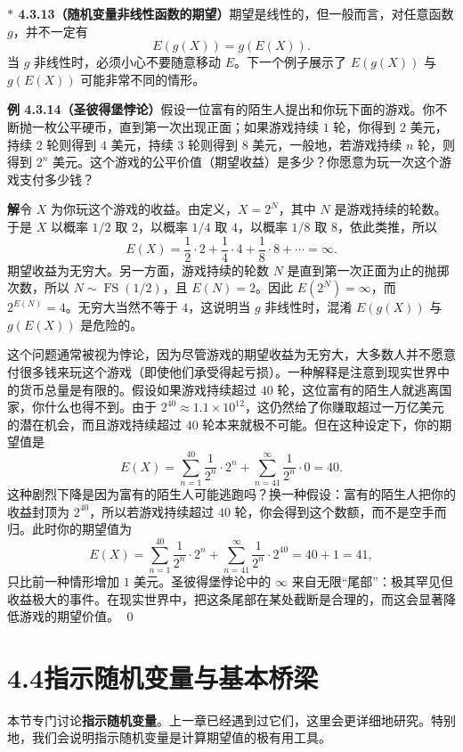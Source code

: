 \documentclass[UTF8, 12pt, fontset=fandol, oneside]{ctexart}
\newcommand{\biohazard}{\ensuremath{\ast}}
\begin{document}
\noindent\textbf{$\biohazard$ 4.3.13（随机变量非线性函数的期望）}\quad 期望是线性的，但一般而言，对任意函数 $g$，并不一定有
\[
  E(g(X))=g(E(X)).
\]
当 $g$ 非线性时，必须小心不要随意移动 $E$。下一个例子展示了 $E(g(X))$ 与 $g(E(X))$ 可能非常不同的情形。

\noindent\textbf{例 4.3.14（圣彼得堡悖论）}\quad 假设一位富有的陌生人提出和你玩下面的游戏。你不断抛一枚公平硬币，直到第一次出现正面；如果游戏持续 $1$ 轮，你得到 $2$ 美元，持续 $2$ 轮则得到 $4$ 美元，持续 $3$ 轮则得到 $8$ 美元，一般地，若游戏持续 $n$ 轮，则得到 $2^n$ 美元。这个游戏的公平价值（期望收益）是多少？你愿意为玩一次这个游戏支付多少钱？

\noindent\textbf{解}\quad 令 $X$ 为你玩这个游戏的收益。由定义，$X=2^N$，其中 $N$ 是游戏持续的轮数。于是 $X$ 以概率 $1/2$ 取 $2$，以概率 $1/4$ 取 $4$，以概率 $1/8$ 取 $8$，依此类推，所以
\[
  E(X)=\frac{1}{2}\cdot 2+\frac{1}{4}\cdot 4+\frac{1}{8}\cdot 8+\cdots=\infty.
\]
期望收益为无穷大。另一方面，游戏持续的轮数 $N$ 是直到第一次正面为止的抛掷次数，所以 $N\sim\operatorname{FS}(1/2)$，且 $E(N)=2$。因此 $E(2^N)=\infty$，而 $2^{E(N)}=4$。无穷大当然不等于 $4$，这说明当 $g$ 非线性时，混淆 $E(g(X))$ 与 $g(E(X))$ 是危险的。

这个问题通常被视为悖论，因为尽管游戏的期望收益为无穷大，大多数人并不愿意付很多钱来玩这个游戏（即使他们承受得起亏损）。一种解释是注意到现实世界中的货币总量是有限的。假设如果游戏持续超过 $40$ 轮，这位富有的陌生人就逃离国家，你什么也得不到。由于 $2^{40}\approx 1.1\times 10^{12}$，这仍然给了你赚取超过一万亿美元的潜在机会，而且游戏持续超过 $40$ 轮本来就极不可能。但在这种设定下，你的期望值是
\[
  E(X)=\sum_{n=1}^{40}\frac{1}{2^n}\cdot 2^n
  +\sum_{n=41}^{\infty}\frac{1}{2^n}\cdot 0
  =40.
\]
这种剧烈下降是因为富有的陌生人可能逃跑吗？换一种假设：富有的陌生人把你的收益封顶为 $2^{40}$，所以若游戏持续超过 $40$ 轮，你会得到这个数额，而不是空手而归。此时你的期望值为
\[
  E(X)=\sum_{n=1}^{40}\frac{1}{2^n}\cdot 2^n
  +\sum_{n=41}^{\infty}\frac{1}{2^n}\cdot 2^{40}
  =40+1=41,
\]
只比前一种情形增加 $1$ 美元。圣彼得堡悖论中的 $\infty$ 来自无限“尾部”：极其罕见但收益极大的事件。在现实世界中，把这条尾部在某处截断是合理的，而这会显著降低游戏的期望价值。 \qed

\section*{4.4\quad 指示随机变量与基本桥梁}

本节专门讨论\textbf{指示随机变量}。上一章已经遇到过它们，这里会更详细地研究。特别地，我们会说明指示随机变量是计算期望值的极有用工具。
\end{document}
